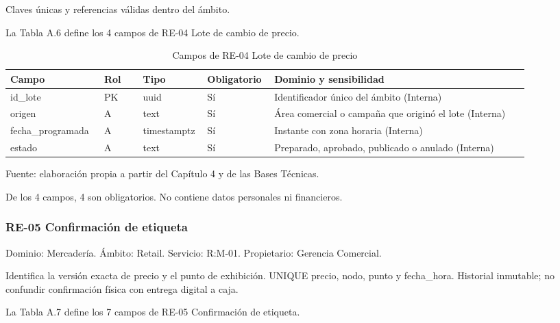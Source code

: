 \documentclass[11pt]{article}
\begin{document}
Claves únicas y referencias válidas dentro del ámbito.

La Tabla A.6 define los 4 campos de RE-04 Lote de cambio de precio.

\begin{table}[htbp]
\caption{Campos de RE-04 Lote de cambio de precio}\label{tab:d_re04}
\centering
\begin{tabular}{@{}p{0.167\linewidth}p{0.070\linewidth}p{0.079\linewidth}p{0.097\linewidth}p{0.465\linewidth}@{}}
\toprule Campo & Rol & Tipo & Obligatorio & Dominio y sensibilidad \\
\midrule
id\_lote & PK & uuid & Sí & Identificador único del ámbito (Interna) \\
origen & A & text & Sí & Área comercial o campaña que originó el lote (Interna) \\
fecha\_programada & A & timestamptz & Sí & Instante con zona horaria (Interna) \\
estado & A & text & Sí & Preparado, aprobado, publicado o anulado (Interna) \\
\bottomrule
\end{tabular}
\par\smallskip
{\raggedright Fuente: elaboración propia a partir del Capítulo 4 y de las Bases Técnicas.\par}
\end{table}


De los 4 campos, 4 son obligatorios. No contiene datos personales ni financieros.

\subsubsection{RE-05 Confirmación de etiqueta}

Dominio: Mercadería. Ámbito: Retail. Servicio: R:M-01. Propietario: Gerencia Comercial.

Identifica la versión exacta de precio y el punto de exhibición. UNIQUE precio, nodo, punto y fecha\_hora. Historial inmutable; no confundir confirmación física con entrega digital a caja.

La Tabla A.7 define los 7 campos de RE-05 Confirmación de etiqueta.

\clearpage
\end{document}
